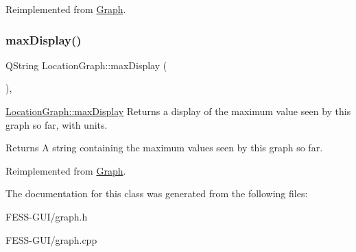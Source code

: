 Reimplemented from \hyperlink{class_graph}{Graph}.

\hypertarget{class_location_graph_a8ac355338680e55af26cb3e74b76d278}{}\label{class_location_graph_a8ac355338680e55af26cb3e74b76d278} 
\subsubsection{\texorpdfstring{max\+Display()}{maxDisplay()}}
{\footnotesize\ttfamily Q\+String Location\+Graph\+::max\+Display (\begin{DoxyParamCaption}{ }\end{DoxyParamCaption})\hspace{0.3cm}{\ttfamily [override]}, {\ttfamily [virtual]}}



\hyperlink{class_location_graph_a8ac355338680e55af26cb3e74b76d278}{Location\+Graph\+::max\+Display} Returns a display of the maximum value seen by this graph so far, with units. 

\begin{DoxyReturn}{Returns}
A string containing the maximum values seen by this graph so far. 
\end{DoxyReturn}


Reimplemented from \hyperlink{class_graph}{Graph}.



The documentation for this class was generated from the following files\+:\begin{DoxyCompactItemize}
\item 
F\+E\+S\+S-\/\+G\+U\+I/graph.\+h\item 
F\+E\+S\+S-\/\+G\+U\+I/graph.\+cpp\end{DoxyCompactItemize}
